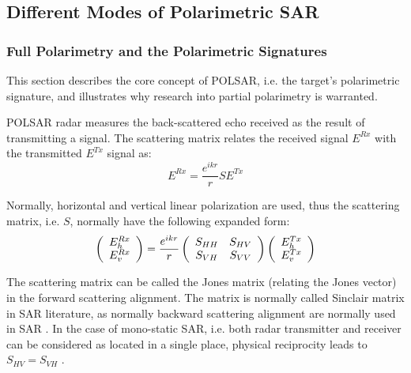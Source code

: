 \subsection{Different Modes of Polarimetric SAR}

\subsubsection{Full Polarimetry and the Polarimetric Signatures}

This section describes the core concept of POLSAR, i.e. the target's polarimetric signature, 
	and illustrates why research into partial polarimetry is warranted.

POLSAR radar measures the back-scattered echo received as the result of transmitting a signal.
The scattering matrix relates the received signal $E^{Rx}$ with the transmitted $E^{Tx}$ signal as:
\begin{equation}
 E^{Rx} = \frac{e^{ikr}}{r} S E^{Tx}
\end{equation}

Normally, horizontal and vertical linear polarization are used, thus the scattering matrix, i.e. $S$, normally have the following expanded form:
\begin{equation}
 \left( 
\begin{array}{c}
 E_h^{Rx} \\
 E_v^{Rx}
\end{array}
 \right) = \frac{e^{ikr}}{r} 
\left( 
\begin{array}{c c}
 S_{HH} & S_{HV} \\
 S_{VH} & S_{VV}
\end{array}
 \right) 
\left( 
\begin{array}{c}
 E_h^{Tx} \\
 E_v^{Tx}
\end{array}
 \right) 
\end{equation}

The scattering matrix can be called the Jones matrix (relating the Jones vector) in the forward scattering alignment.
The matrix is normally called Sinclair matrix in SAR literature, as normally backward scattering alignment are normally used in SAR \cite{Sinclair_1950_ProcsIRE}.
In the case of mono-static SAR, i.e. both radar transmitter and receiver can be considered as located in a single place, physical reciprocity leads to $S_{HV}=S_{VH}$ \cite{Nghiem_1992_RadioSci}.


